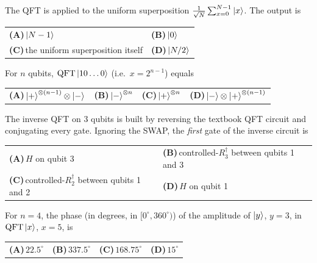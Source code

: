 \documentclass[11pt,a4paper]{article}
\newcommand{\optlabel}[1]{\textbf{(#1)}}
\newenvironment{qitem}[1]{\begin{list}{}{\setlength{\leftmargin}{3.3em}\setlength{\labelwidth}{3.1em}%
  \setlength{\labelsep}{0.2em}\setlength{\topsep}{3pt}\setlength{\parsep}{3pt}}\item[\textbf{Q.#1}\hfill]}{\end{list}}
\newcommand{\qsep}{\par\vspace{2pt}{\color{black!15}\hrule}\vspace{4pt}}
\begin{document}
\begin{qitem}{49}
The QFT is applied to the uniform superposition $\frac{1}{\sqrt N}\sum_{x=0}^{N-1}\ket{x}$. The output is
\par\smallskip\noindent\begin{tabularx}{\linewidth}{@{}*{2}{L}@{}}
\optlabel{A}\,$\ket{N-1}$ & \optlabel{B}\,$\ket{0}$ \\[3pt]
\optlabel{C}\,the uniform superposition itself & \optlabel{D}\,$\ket{N/2}$
\end{tabularx}
\end{qitem}
\qsep

\begin{qitem}{50}
For $n$ qubits, $\mathrm{QFT}\ket{10\dots0}$ (i.e.\ $x = 2^{n-1}$) equals
\par\smallskip\noindent\begin{tabularx}{\linewidth}{@{}*{4}{L}@{}}
\optlabel{A}\,$\ket{+}^{\otimes(n-1)}\otimes\ket{-}$ & \optlabel{B}\,$\ket{-}^{\otimes n}$ & \optlabel{C}\,$\ket{+}^{\otimes n}$ & \optlabel{D}\,$\ket{-}\otimes\ket{+}^{\otimes(n-1)}$
\end{tabularx}
\end{qitem}
\qsep

\begin{qitem}{51}
The inverse QFT on 3 qubits is built by reversing the textbook QFT circuit and conjugating every gate. Ignoring the
SWAP, the \emph{first} gate of the inverse circuit is
\par\smallskip\noindent\begin{tabularx}{\linewidth}{@{}*{2}{L}@{}}
\optlabel{A}\,$H$ on qubit 3 & \optlabel{B}\,controlled-$R_3^\dagger$ between qubits 1 and 3 \\[3pt]
\optlabel{C}\,controlled-$R_2^\dagger$ between qubits 1 and 2 & \optlabel{D}\,$H$ on qubit 1
\end{tabularx}
\end{qitem}
\qsep

\begin{qitem}{52}
For $n = 4$, the phase (in degrees, in $[0^\circ, 360^\circ)$) of the amplitude of $\ket{y}$, $y = 3$, in $\mathrm{QFT}\ket{x}$, $x = 5$, is
\par\smallskip\noindent\begin{tabularx}{\linewidth}{@{}*{4}{L}@{}}
\optlabel{A}\,$22.5^\circ$ & \optlabel{B}\,$337.5^\circ$ & \optlabel{C}\,$168.75^\circ$ & \optlabel{D}\,$15^\circ$
\end{tabularx}
\end{qitem}
\qsep
\end{document}
